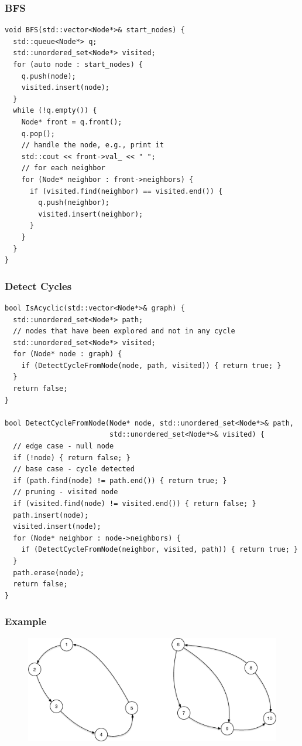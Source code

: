 \subsubsection{BFS}
\begin{lstlisting}
void BFS(std::vector<Node*>& start_nodes) {
  std::queue<Node*> q;
  std::unordered_set<Node*> visited;
  for (auto node : start_nodes) {
    q.push(node);
    visited.insert(node);
  }
  while (!q.empty()) {
    Node* front = q.front();
    q.pop();
    // handle the node, e.g., print it
    std::cout << front->val_ << " ";
    // for each neighbor
    for (Node* neighbor : front->neighbors) {
      if (visited.find(neighbor) == visited.end()) {
        q.push(neighbor);
        visited.insert(neighbor);
      }
    }
  }
}
\end{lstlisting}

\subsubsection{Detect Cycles}
\begin{lstlisting}
bool IsAcyclic(std::vector<Node*>& graph) {
  std::unordered_set<Node*> path;
  // nodes that have been explored and not in any cycle
  std::unordered_set<Node*> visited;
  for (Node* node : graph) {
    if (DetectCycleFromNode(node, path, visited)) { return true; }
  }
  return false;
}

bool DetectCycleFromNode(Node* node, std::unordered_set<Node*>& path,
                         std::unordered_set<Node*>& visited) {
  // edge case - null node
  if (!node) { return false; }
  // base case - cycle detected
  if (path.find(node) != path.end()) { return true; }
  // pruning - visited node
  if (visited.find(node) != visited.end()) { return false; }
  path.insert(node);
  visited.insert(node);
  for (Node* neighbor : node->neighbors) {
    if (DetectCycleFromNode(neighbor, visited, path)) { return true; }
  }
  path.erase(node);
  return false;
}
\end{lstlisting}

\subsubsection{Example}
\begin{figure}[H]
\centering
\includegraphics[width=0.7\linewidth]{images/directed_graph_eg}
\end{figure}

